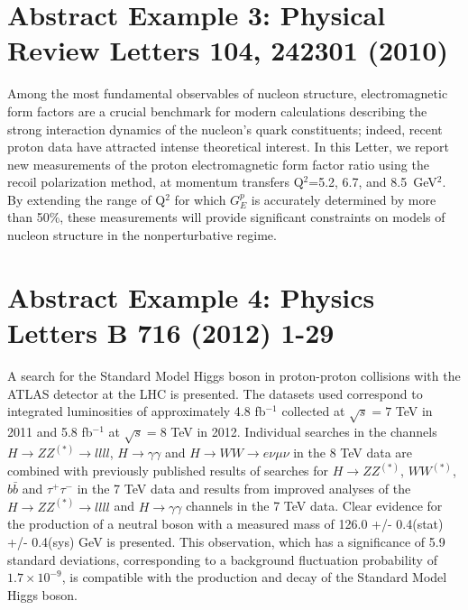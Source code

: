 \documentclass{article}
\begin{document}
\section{Abstract Example 3: Physical Review Letters 104, 242301 (2010)}
Among the most fundamental observables of nucleon structure, electromagnetic
form factors are a crucial benchmark for modern calculations describing the
strong interaction dynamics of the nucleon's quark constituents; indeed,
recent proton data have attracted intense theoretical interest. In this
Letter, we report new measurements of the proton electromagnetic form factor
ratio using the recoil polarization method, at momentum transfers 
Q$^2$=5.2, 6.7, and 8.5~GeV$^2$. By extending the range of Q$^2$ for which
$G_E^p$ is accurately determined by more than 50\%, these measurements will
provide significant constraints on models of nucleon structure in the
nonperturbative regime.

\section{Abstract Example 4: Physics Letters B 716 (2012) 1-29}

A search for the Standard Model Higgs boson in proton-proton collisions with the ATLAS detector at the LHC is presented. The datasets used correspond to integrated luminosities of approximately 4.8 fb$^{-1}$ collected at $\sqrt{s} = 7$ TeV in 2011 and 5.8 fb$^{-1}$ at $\sqrt{s} = 8$ TeV in 2012. Individual searches in the channels $H \rightarrow ZZ^{(*)}\rightarrow llll$, $H\rightarrow\gamma \gamma$ and $H\rightarrow WW \rightarrow e \nu \mu \nu$ in the 8 TeV data are combined with previously published results of searches for $H\rightarrow ZZ^{(*)}$, $WW^{(*)}$, $b\bar{b}$ and $\tau^+\tau^-$ in the 7 TeV data and results from improved analyses of the $H\rightarrow ZZ^{(*)}\rightarrow llll$ and $H\rightarrow \gamma \gamma$ channels in the 7 TeV data. Clear evidence for the production of a neutral boson with a measured mass of 126.0 +/- 0.4(stat) +/- 0.4(sys) GeV is presented. This observation, which has a significance of 5.9 standard deviations, corresponding to a background fluctuation probability of $1.7\times 10^{-9}$, is compatible with the production and decay of the Standard Model Higgs boson.
\end{document}
